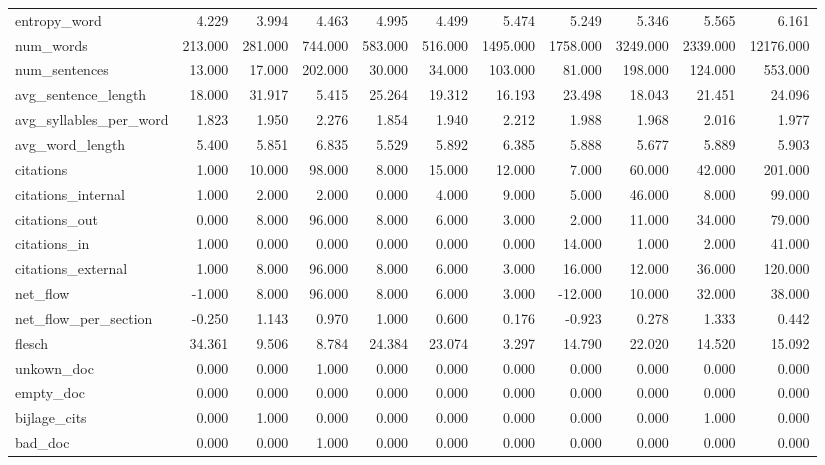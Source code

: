 \begin{tabular}{lrrrrrrrrrr}
\cline{1-11}
entropy\_word & 4.229 & 3.994 & 4.463 & 4.995 & 4.499 & 5.474 & 5.249 & 5.346 & 5.565 & 6.161 \\
\cline{1-11}
num\_words & 213.000 & 281.000 & 744.000 & 583.000 & 516.000 & 1495.000 & 1758.000 & 3249.000 & 2339.000 & 12176.000 \\
\cline{1-11}
num\_sentences & 13.000 & 17.000 & 202.000 & 30.000 & 34.000 & 103.000 & 81.000 & 198.000 & 124.000 & 553.000 \\
\cline{1-11}
avg\_sentence\_length & 18.000 & 31.917 & 5.415 & 25.264 & 19.312 & 16.193 & 23.498 & 18.043 & 21.451 & 24.096 \\
\cline{1-11}
avg\_syllables\_per\_word & 1.823 & 1.950 & 2.276 & 1.854 & 1.940 & 2.212 & 1.988 & 1.968 & 2.016 & 1.977 \\
\cline{1-11}
avg\_word\_length & 5.400 & 5.851 & 6.835 & 5.529 & 5.892 & 6.385 & 5.888 & 5.677 & 5.889 & 5.903 \\
\cline{1-11}
citations & 1.000 & 10.000 & 98.000 & 8.000 & 15.000 & 12.000 & 7.000 & 60.000 & 42.000 & 201.000 \\
\cline{1-11}
citations\_internal & 1.000 & 2.000 & 2.000 & 0.000 & 4.000 & 9.000 & 5.000 & 46.000 & 8.000 & 99.000 \\
\cline{1-11}
citations\_out & 0.000 & 8.000 & 96.000 & 8.000 & 6.000 & 3.000 & 2.000 & 11.000 & 34.000 & 79.000 \\
\cline{1-11}
citations\_in & 1.000 & 0.000 & 0.000 & 0.000 & 0.000 & 0.000 & 14.000 & 1.000 & 2.000 & 41.000 \\
\cline{1-11}
citations\_external & 1.000 & 8.000 & 96.000 & 8.000 & 6.000 & 3.000 & 16.000 & 12.000 & 36.000 & 120.000 \\
\cline{1-11}
net\_flow & -1.000 & 8.000 & 96.000 & 8.000 & 6.000 & 3.000 & -12.000 & 10.000 & 32.000 & 38.000 \\
\cline{1-11}
net\_flow\_per\_section & -0.250 & 1.143 & 0.970 & 1.000 & 0.600 & 0.176 & -0.923 & 0.278 & 1.333 & 0.442 \\
\cline{1-11}
flesch & 34.361 & 9.506 & 8.784 & 24.384 & 23.074 & 3.297 & 14.790 & 22.020 & 14.520 & 15.092 \\
\cline{1-11}
unkown\_doc & 0.000 & 0.000 & 1.000 & 0.000 & 0.000 & 0.000 & 0.000 & 0.000 & 0.000 & 0.000 \\
\cline{1-11}
empty\_doc & 0.000 & 0.000 & 0.000 & 0.000 & 0.000 & 0.000 & 0.000 & 0.000 & 0.000 & 0.000 \\
\cline{1-11}
bijlage\_cits & 0.000 & 1.000 & 0.000 & 0.000 & 0.000 & 0.000 & 0.000 & 0.000 & 1.000 & 0.000 \\
\cline{1-11}
bad\_doc & 0.000 & 0.000 & 1.000 & 0.000 & 0.000 & 0.000 & 0.000 & 0.000 & 0.000 & 0.000 \\
\cline{1-11}
\bottomrule
\end{tabular}
